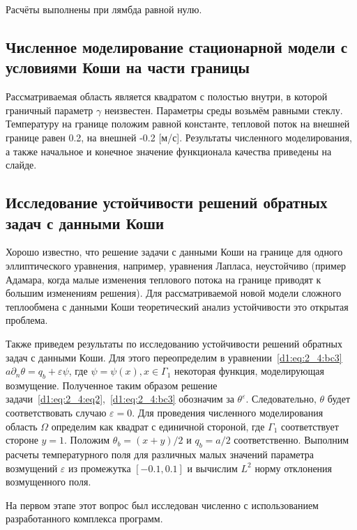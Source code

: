 \documentclass[8pt,a4paper]{article}
\begin{document}
    Расчёты выполнены при лямбда равной нулю.

    \subsection*{Численное моделирование стационарной модели с условиями Коши на части границы}
    Рассматриваемая область является квадратом с полостью внутри, в которой граничный параметр $\gamma$ неизвестен.
    Параметры среды возьмём равными стеклу.
    Температуру на границе положим равной константе,
    тепловой поток на внешней границе равен 0.2, на внешней -0.2 [м/с].
    Результаты численного моделирования, а также начальное и конечное
    значение функционала качества приведены на слайде.



    \subsection*{Исследование устойчивости решений обратных задач с данными Коши}
    Хорошо известно, что решение задачи с данными
    Коши на границе для одного эллиптического уравнения,
    например, уравнения Лапласа, неустойчиво
    (пример Адамара, когда малые изменения теплового потока на границе приводят к большим изменениям решения).
    Для рассматриваемой новой модели сложного теплообмена с данными Коши
    теоретический анализ устойчивости это открытая проблема.


    Также приведем результаты по исследованию устойчивости решений
    обратных задач с данными Коши.
    Для этого переопределим в уравнении~\eqref{d1:eq:2_4:bc3} $a\partial_n \theta = q_b +\varepsilon \psi$,
    где $\psi = \psi(x), x \in \Gamma_1$ некоторая функция, моделирующая возмущение.
    Полученное таким образом решение задачи~\eqref{d1:eq:2_4:eq2},~\eqref{d1:eq:2_4:bc3}
    обозначим за $\theta^{\varepsilon}$.
    Следовательно, $\theta$ будет соответствовать случаю $\varepsilon = 0$.
    Для проведения численного моделирования область $\Omega$ определим
    как квадрат с единичной стороной, где $\Gamma_1$ соответствует стороне $y = 1$.
    Положим $\theta_b = (x + y) / 2$ и $q_b = a / 2$ соответственно.
    Выполним расчеты температурного поля
    для различных малых значений параметра возмущений $\varepsilon$
    из промежутка $[-0.1, 0.1]$ и вычислим $L^2$ норму отклонения возмущенного поля.


    На первом этапе этот вопрос был исследован численно с использованием
    разработанного комплекса программ.
\end{document}
